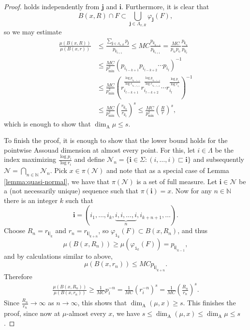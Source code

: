 \documentclass{PRM}
\newcommand{\field}[1]{\mathbb{#1}}
\newcommand{\N}{\field{N}}
\newcommand{\smalli}{\mathtt{i}}
\newcommand{\adim}{\dim_{\mathrm{A}}}
\theoremstyle{plain}
\theoremstyle{definition}
\theoremstyle{remark}
\begin{document}
\begin{proof}
holds independently from $\mathbf{j}$ and $\mathbf{i}$.
Furthermore, it is clear that
\begin{equation*}
    B(x,R)\cap F\subset\bigcup_{\mathbf{j}\in\Lambda_{x,R}}\varphi_{\mathbf{j}}(F),
\end{equation*}
so we may estimate
\begin{align*}
    \frac{\mu(B(x,R))}{\mu(B(x,r))}&\leq \frac{\sum_{\mathbf{j}\in\Lambda_{x,R}}p_{\mathbf{j}}}{p_{\mathbf{i}|_{l+1}}}\leq MC\frac{p_{\mathbf{i}|_{k-1}}}{p_{\mathbf{i}|_{l+1}}}=\frac{MC}{p_{i_k}p_{i_l}}\frac{p_{\mathbf{i}|_k}}{p_{\mathbf{i}|_l}}\\
    &\leq \frac{MC}{p_{\min}^2}\left(p_{i_{l-k+1}}p_{i_{l-k+2}}\cdots p_{i_l}\right)^{-1}\\
    &\leq \frac{MC}{p_{\min}^2}\left(r_{i_{l-k+1}}^{\frac{\log p_{i_{k-l+1}}}{\log r_{i_{k-l+1}}}}r_{i_{l-k+2}}^{\frac{\log p_{i_{k-l+2}}}{\log r_{i_{k-l+2}}}}\cdots r_{i_l}^{\frac{\log p_{i_{l}}}{\log r_{i_{l}}}}\right)^{-1}\\
    &\leq\frac{MC}{p_{\min}^2}\left(\frac{r_{\mathbf{i}|_{k}}}{r_{\mathbf{i}|_l}}\right)^{s}
    \leq  \frac{MC}{p_{\min}^2}\left(\frac{R}{r}\right)^{s},
\end{align*}
which is enough to show that $\dim_{\mathrm{A}}\mu\leq s$.

To finish the proof, it is enough to show that the lower bound holds for the pointwise Assouad dimension at almost every point. For this, let $i\in\Lambda$ be the index maximizing $\frac{\log p_i}{\log r_i}$ and define $\mathcal{N}_n=\{\mathbf{i}\in\Sigma\colon (i,\ldots,i)\sqsubset \mathbf{i}\}$ and subsequently $\mathcal{N}=\bigcap_{n\in\N}\mathcal{N}_n$. Pick $x\in \pi(\mathcal{N})$ and note that as a special case of Lemma \ref{lemma:quasi-normal}, we have that $\pi(\mathcal{N})$ is a set of full measure. Let $\mathbf{i}\in \mathcal{N}$ be a (not necessarily unique) sequence such that $\pi(\mathbf{i})=x$. Now for any $n\in\N$ there is an integer $k$ such that
\begin{equation*}
    \mathbf{i}=(i_1,\ldots,i_k,\underbrace{i,i,\ldots,i}_n,i_{k+n+1},\ldots).
\end{equation*}
Choose $R_n = r_{\mathbf{i}|_{k}}$ and $r_n=r_{\mathbf{i}|_{k+n}}$, so $\varphi_{\smalli_{k}}(F)\subset B(x,R_n)$, and thus
\begin{equation*}
    \mu(B(x,R_n))\geq\mu(\varphi_{\smalli_{k}}(F))=p_{\mathbf{i}|_{k-1}},
\end{equation*}
and by calculations similar to above,
\begin{equation*}
    \mu(B(x,r_n))\leq MC p_{\mathbf{i}|_{k+n}}.
\end{equation*}
Therefore
\begin{align*}
    \frac{\mu(B(x,R_n))}{\mu(B(x,r_n))}\geq \frac{1}{MC}p_i^{-n}=\frac{1}{MC}(r_i^{-n})^{s}= \frac{1}{MC}\left(\frac{R_n}{r_n}\right)^{s}.
\end{align*}
Since $\frac{R_n}{r_n}\to\infty$ as $n\to \infty$, this shows that $\dim_{\mathrm{A}}(\mu,x)\geq s$. This finishes the proof, since now at $\mu$-almost every $x$, we have $s\leq \adim(\mu,x)\leq \adim\mu\leq s$.
\end{proof}
\end{document}

